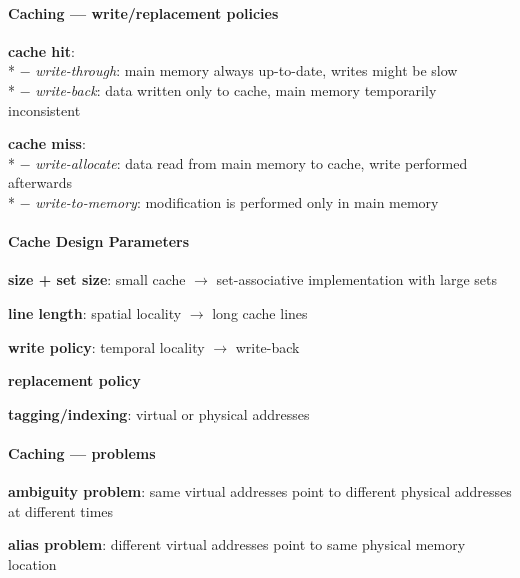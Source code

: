 \paragraph{Caching --- write/replacement policies}
\begin{items}
  \item \textbf{cache hit}: \\*
    $ - $ \emph{write-through}: main memory always up-to-date, writes might be slow \\*
    $ - $ \emph{write-back}: data written only to cache, main memory temporarily inconsistent
  \item \textbf{cache miss}: \\*
    $ - $ \emph{write-allocate}: data read from main memory to cache, write performed afterwards \\*
    $ - $ \emph{write-to-memory}: modification is performed only in main memory
\end{items}

\paragraph{Cache Design Parameters}
\begin{items}
  \item \textbf{size + set size}: small cache $ \to $ set-associative implementation with large sets
  \item \textbf{line length}: spatial locality $ \to $ long cache lines
  \item \textbf{write policy}: temporal locality $ \to $ write-back
  \item \textbf{replacement policy}
  \item \textbf{tagging/indexing}: virtual or physical addresses
\end{items}

\paragraph{Caching --- problems}
\begin{items}
  \item \textbf{ambiguity problem}: same virtual addresses point to different physical addresses at different times
  \item \textbf{alias problem}: different virtual addresses point to same physical memory location
\end{items}

